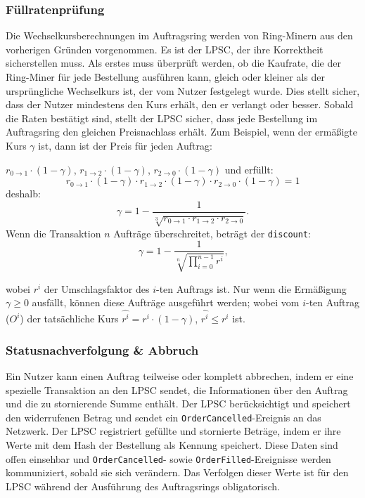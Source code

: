 \documentclass[UTF8,nofonts]{article}
\begin{document}
\begin{multicols}{2}
\subsubsection{Füllratenprüfung\label{sec:fill_rate_check}}

Die Wechselkursberechnungen im Auftragsring werden von Ring-Minern aus den vorherigen Gründen vorgenommen. Es ist der LPSC, der ihre Korrektheit sicherstellen muss. Als erstes muss überprüft werden, ob die Kaufrate, die der Ring-Miner für jede Bestellung ausführen kann, gleich oder kleiner als der ursprüngliche Wechselkurs ist, der vom Nutzer festgelegt wurde. Dies stellt sicher, dass der Nutzer mindestens den Kurs erhält, den er verlangt oder besser. Sobald die Raten bestätigt sind, stellt der LPSC sicher, dass jede Bestellung im Auftragsring den gleichen Preisnachlass erhält. Zum Beispiel, wenn der ermäßigte Kurs $\gamma$ ist, dann ist der Preis für jeden Auftrag: 

$r_{0\rightarrow 1} \cdot (1-\gamma)$, $r_{1\rightarrow 2} \cdot (1-\gamma)$, $r_{2 \rightarrow 0} \cdot (1-\gamma)$ und erfüllt:  
\begin{equation}
r_{0\rightarrow 1} \cdot (1-\gamma)\cdot r_{1\rightarrow 2} \cdot (1-\gamma) \cdot r_{2 \rightarrow 0} \cdot (1-\gamma) = 1
\end{equation}
deshalb:
\begin{equation}
\gamma = 1- \frac{1}{\sqrt[3]{r_{0\rightarrow 1} \cdot r_{1\rightarrow 2} \cdot r_{2\rightarrow 0}}}\text{.}
\end{equation}
Wenn die Transaktion $n$ Aufträge überschreitet, beträgt der \texttt{discount}: 
\begin{equation}
\gamma = 1- \frac{1}{\sqrt[n]{\prod_{i=0}^{n-1} r^i}} \text{,}
\end{equation}

wobei $r^i$ der Umschlagsfaktor des $i$-ten Auftrags ist. Nur wenn die Ermäßigung $\gamma \ge 0$ ausfällt, können diese Aufträge ausgeführt werden; wobei vom $i$-ten Auftrag ($O^i$) der tatsächliche Kurs $\hat{r^i} = r^i \cdot (1-\gamma)$, $\hat{r^i}\le r^i$ ist.


\subsubsection{Statusnachverfolgung \& Abbruch}

Ein Nutzer kann einen Auftrag teilweise oder komplett abbrechen, indem er eine spezielle Transaktion an den LPSC sendet, die Informationen über den Auftrag und die zu stornierende Summe enthält. Der LPSC berücksichtigt und speichert den widerrufenen Betrag und sendet ein \verb|OrderCancelled|-Ereignis an das Netzwerk. Der LPSC registriert gefüllte und stornierte Beträge, indem er ihre Werte mit dem Hash der Bestellung als Kennung speichert. Diese Daten sind offen einsehbar und \verb|OrderCancelled|- sowie \verb|OrderFilled|-Ereignisse werden kommuniziert, sobald sie sich verändern. Das Verfolgen dieser Werte ist für den LPSC während der Ausführung des Auftragsrings obligatorisch.


\end{multicols}
\end{document}
